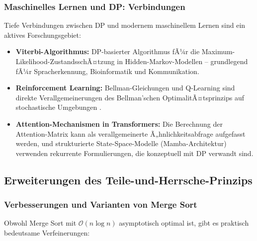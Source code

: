 ﻿\documentclass[a4paper,12pt]{article}
\theoremstyle{definition}
\begin{document}
\subsubsection{Maschinelles Lernen und DP: Verbindungen}

Tiefe Verbindungen zwischen DP und modernem maschinellem Lernen sind ein aktives
Forschungsgebiet:
\begin{itemize}
    \item \textbf{Viterbi-Algorithmus:} DP-basierter Algorithmus fÃ¼r die
          Maximum-Likelihood-ZustandsschÃ¤tzung in Hidden-Markov-Modellen --
          grundlegend fÃ¼r Spracherkennung, Bioinformatik und Kommunikation.
    \item \textbf{Reinforcement Learning:} Bellman-Gleichungen und
          Q-Learning sind direkte Verallgemeinerungen des Bellman'schen
          OptimalitÃ¤tsprinzips auf stochastische Umgebungen \cite{sutton2018}.
    \item \textbf{Attention-Mechanismen in Transformers:} Die Berechnung der
          Attention-Matrix kann als verallgemeinerte Ã„hnlichkeitsabfrage
          aufgefasst werden, und strukturierte State-Space-Modelle
          (Mamba-Architektur) verwenden rekurrente Formulierungen, die
          konzeptuell mit DP verwandt sind.
\end{itemize}

\subsection{Erweiterungen des Teile-und-Herrsche-Prinzips}

\subsubsection{Verbesserungen und Varianten von Merge Sort}

Obwohl Merge Sort mit $\mathcal{O}(n \log n)$ asymptotisch optimal ist, gibt es
praktisch bedeutsame Verfeinerungen:
\end{document}
